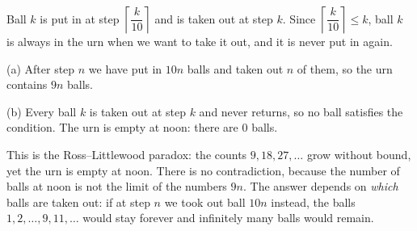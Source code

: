 Ball $k$ is put in at step $\left\lceil\dfrac{k}{10}\right\rceil$ and is taken out at step $k$. Since $\left\lceil\dfrac{k}{10}\right\rceil\le k$, ball $k$ is always in the urn when we want to take it out, and it is never put in again.

(a) After step $n$ we have put in $10n$ balls and taken out $n$ of them, so the urn contains $\boxed{9n}$ balls.

(b) Every ball $k$ is taken out at step $k$ and never returns, so no ball satisfies the condition. The urn is empty at noon: there are $\boxed{0}$ balls.

This is the Ross--Littlewood paradox: the counts $9,18,27,\dots$ grow without bound, yet the urn is empty at noon. There is no contradiction, because the number of balls at noon is not the limit of the numbers $9n$. The answer depends on \emph{which} balls are taken out: if at step $n$ we took out ball $10n$ instead, the balls $1,2,\dots,9,11,\dots$ would stay forever and infinitely many balls would remain.

